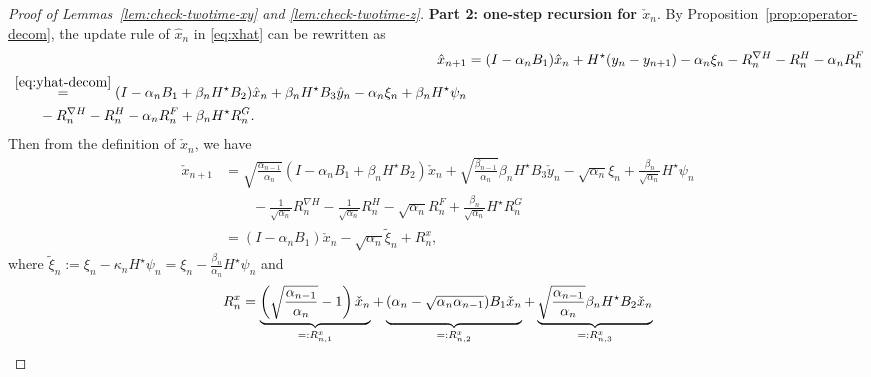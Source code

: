 \documentclass[11pt]{article}
\theoremstyle{plain}
\theoremstyle{definition}
\def\nablaH{\nabla H}
\def\mI{{\bm{I}}}
\newcommand{\xhat}{{\hat{x}}}
\newcommand{\yhat}{{\hat{y}}}
\newcommand{\xcheck}{{\check{x}}}
\newcommand{\ycheck}{{\check{y}}}
\newcommand{\yy}{{y}}
\def\mI{{I}}
\begin{document}
\begin{appendix}
\begin{proof}[Proof of Lemmas~\ref{lem:check-twotime-xy} and \ref{lem:check-twotime-z}]
\textbf{Part 2: one-step recursion for $\xcheck_{n}$}.
By Proposition~\ref{prop:operator-decom}, the update rule of $\xhat_{n}$ in \eqref{eq:xhat} can be rewritten as
\begin{align}
    \xhat_{n+1} & = (\mI - \alpha_{n} B_1) \xhat_{n} + H^\star (\yy_{n} - \yy_{n+1}) - \alpha_{n} \xi_{n} - R_{n}^{\nablaH} - R_{n}^{H} - \alpha_{n} R_{n}^F \nonumber \\ 
    \begin{split}
        & \overset{\eqref{eq:yhat-decom}}{=} (\mI - \alpha_{n} B_1 + \beta_{n} H^\star B_2) \xhat_{n} + \beta_n H^\star B_3 \yhat_{n} - \alpha_n \xi_{n} + \beta_{n} H^\star \psi_{n} \\
        & \qquad - R_{n}^{\nablaH} - R_{n}^H - \alpha_{n} R_{n}^F + \beta_n H^\star R_{n}^G. 
    \end{split}
    \label{eq:xhat-decom}
\end{align}
Then from the definition of $\xcheck_{n}$, we have
\begin{align}
    \xcheck_{n+1}
    & = \sqrt{ \frac{\alpha_{n-1}}{\alpha_{n}} } (\mI - \alpha_{n} B_1 + \beta_n H^\star B_2) \xcheck_{n} + \sqrt{ \frac{\beta_{n-1}}{\alpha_{n}} } \beta_{n} H^\star B_3 \ycheck_{n} - \sqrt{ \alpha_{n} } \xi_{n} + \frac{ \beta_{n} }{ \sqrt{ \alpha_{n} } } H^\star \psi_{n} \nonumber \\
    & \qquad - \frac{1}{ \sqrt{\alpha_{n}} } R_{n}^{\nablaH} - \frac{1}{\sqrt{\alpha_{n}}} R_{n}^{H} - \sqrt{\alpha_{n}} R_{n}^F + \frac{\beta_{n}}{\sqrt{ \alpha_{n} }} H^\star R_{n}^G \nonumber \\
    & = (\mI - \alpha_{n} B_1) \xcheck_{n} - \sqrt{\alpha_{n}} \tilde{\xi}_{n} + R_{n}^x, \label{eq:lem:check-twotime:x-update}
\end{align}
where $\tilde{\xi}_{n} := \xi_{n} - \kappa_{n} H^\star \psi_{n} = \xi_{n} - \frac{\beta_{n}}{\alpha_{n}} H^\star \psi_{n}$ and 
\begin{align}\label{eq:lem:check-twotime:Rx}
    \begin{split}
        R_{n}^x
        & = \underbrace{ \left( \sqrt{ \frac{\alpha_{n-1}}{\alpha_{n}} } - 1 \right) \xcheck_{n} }_{=: R_{n,1}^x} 
        + \underbrace{ (\alpha_{n} - \sqrt{ \alpha_{n} \alpha_{n-1} }) B_1 \xcheck_{n} 
            \vphantom{\left( \sqrt{ \frac{\alpha_{n-1}}{\alpha_{n}} } \right) } }_{=: R_{n,2}^x} 
        + \underbrace{ \sqrt{\frac{ \alpha_{n-1} }{ \alpha_{n} } } \beta_{n} H^\star B_2 \xcheck_{n} 
            \vphantom{\left( \sqrt{ \frac{\alpha_{n-1}}{\alpha_{n}} } \right) }}_{=: R_{n,3}^x} \\

\end{split}
\end{align}
\end{proof}
\end{appendix}
\end{document}
